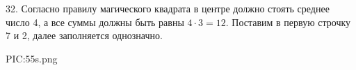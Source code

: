 32. Согласно правилу магического квадрата в центре должно стоять среднее число 4, а все суммы должны быть равны $4\cdot3=12.$ Поставим в первую строчку 7 и 2, далее заполняется однозначно.
\begin{center}
{{PIC:55s.png}}
\end{center}
